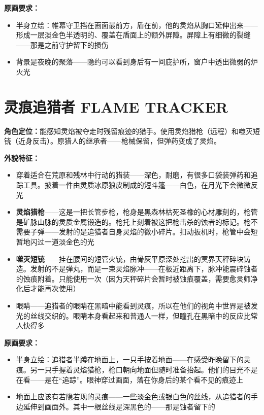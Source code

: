 \documentclass[12pt,a4paper,openany]{ctexbook}
\begin{document}
\textbf{原画要求：}
\begin{itemize}
    \item 半身立绘：帷幕守卫挡在画面最前方，盾在前，他的灵焰从胸口延伸出来——形成一层淡金色半透明的、覆盖在盾面上的额外屏障。屏障上有细微的裂缝——那是之前守护留下的损伤
    \item 背景是夜晚的聚落——隐约可以看到身后有一间庇护所，窗户中透出微弱的炉火光
\end{itemize}

\section{灵痕追猎者 FLAME TRACKER}

\textbf{角色定位：}能感知灵焰被夺走时残留痕迹的猎手。使用灵焰猎枪（远程）和噬灭短铳（近身反击）。原猎人的继承者——枪械保留，但弹药变成了灵焰。

\textbf{外貌特征：}
\begin{itemize}
    \item 穿着适合在荒原和残林中行动的猎装——深色，耐磨，有很多口袋装弹药和追踪工具。披着一件由灵质冰原狼皮制成的短斗篷——白色，在月光下会微微反光
    \item \textbf{灵焰猎枪}——这是一把长管步枪，枪身是黑森林枯死圣橡的心材雕刻的，枪管是矿脉山脉的灵质金属锻造的。枪托上刻着被这把枪击杀的蚀者的标记。枪不需要子弹——发射的是追猎者自身灵焰的微小碎片。扣动扳机时，枪管中会短暂地闪过一道淡金色的光
    \item \textbf{噬灭短铳}——挂在腰间的短管火铳，由骨灰平原深处挖出的冥界天秤碎块铸造。发射的不是弹丸，而是一束灵焰脉冲——在极近距离下，脉冲能震碎蚀者的蚀痕附着。只能使用一次（因为天秤碎片会暂时被蚀痕覆盖，需要愈灵师净化后才能再次使用）
    \item 眼睛——追猎者的眼睛在黑暗中能看到灵痕，所以在他们的视角中世界是被发光的丝线交织的。眼睛本身看起来和普通人一样，但瞳孔在黑暗中的反应比常人快得多
\end{itemize}

\textbf{原画要求：}
\begin{itemize}
    \item 半身立绘：追猎者半蹲在地面上，一只手按着地面——在感受昨晚留下的灵痕。另一只手握着灵焰猎枪，枪口朝向地面但随时准备抬起。他们的目光不是在看——是在“追踪”。眼神穿过画面，落在你身后的某个看不见的痕迹上
    \item 地面上应该有若隐若现的灵痕——一些淡金色或银白色的丝线，从追猎者的手边延伸到画面外。其中一根丝线是深黑色的——那是蚀者留下的
\end{itemize}
\end{document}
